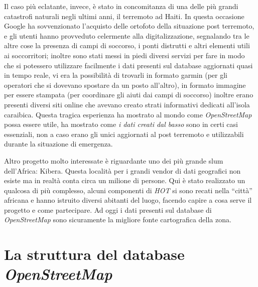 \documentclass[a4paper,twoside,12pt,]{article}
\newcommand{\osm}{\emph{OpenStreetMap}\xspace}
\newcommand{\pro}[1]{\emph{#1}}
\begin{document}
Il caso più eclatante, invece, è stato in concomitanza di una delle più grandi catastrofi naturali negli ultimi anni, il terremoto ad Haiti. In questa occasione Google ha sovvenzionato l'acquisto delle ortofoto della situazione post terremoto, e gli utenti hanno provveduto celermente alla digitalizzazione, segnalando tra le altre cose la presenza di campi di soccorso, i ponti distrutti e altri elementi utili ai soccorritori; inoltre sono stati messi in piedi diversi servizi per fare in modo che si potessero utilizzare facilmente i dati presenti sul database aggiornati quasi in tempo reale, vi era la possibilità di trovarli in formato garmin (per gli operatori che si dovevano spostare da un posto all'altro), in formato immagine per essere stampata (per coordinare gli aiuti dai campi di soccorso) inoltre erano presenti diversi siti online che avevano creato strati informativi dedicati all'isola caraibica. Questa tragica esperienza ha mostrato al mondo come \osm possa essere utile, ha mostrato come \textit{i dati creati dal basso} sono in certi casi essenziali, non a caso erano gli unici aggiornati al post terremoto e utilizzabili durante la situazione di emergenza.

Altro progetto molto interessate è riguardante uno dei più grande slum dell'Africa: Kibera.
Questa località per i grandi vendor di dati geografici non esiste ma in realtà conta circa un milione di persone. Qui è stato realizzato un qualcosa di più complesso, alcuni componenti di \pro{HOT} si sono recati nella ``città'' africana e hanno istruito diversi abitanti del luogo, facendo capire a cosa serve il progetto e come partecipare. Ad oggi i dati presenti sul database di \osm sono sicuramente la migliore fonte cartografica della zona.

\section{La struttura del database \osm}
\end{document}

